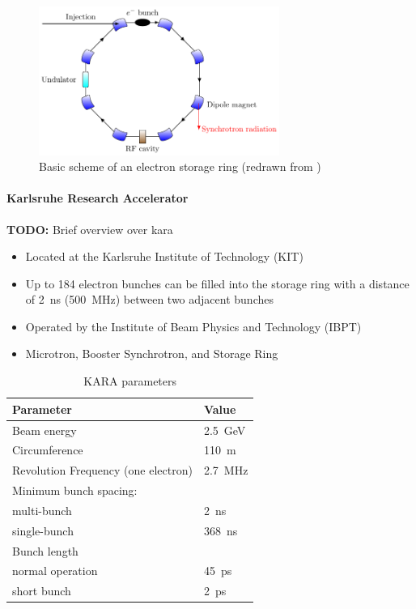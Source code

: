 \begin{figure}[tbh]
	\centering
	\includegraphics[width=0.7\textwidth]{chap/02-theory/img/synchrotron}
	\caption{Basic scheme of an electron storage ring (redrawn from \cite{roussel2014})}
	\label{fig:storageRing}
\end{figure}
\paragraph{Karlsruhe Research Accelerator}
\textbf{TODO:} Brief overview over \gls{kara}
\begin{itemize}[noitemsep]
	\item Located at the Karlsruhe Institute of Technology (KIT)
	\item Up to 184 electron bunches can be filled into the storage ring with a distance of \SI{2}{\nano\second} (\SI{500}{\mega\hertz}) between two adjacent bunches
	\item Operated by the Institute of Beam Physics and Technology (IBPT)
	\item Microtron, Booster Synchrotron, and Storage Ring
\end{itemize}

\begin{table}[tbh]
	\caption{KARA parameters \cite{rota2018}}
	\label{tab:kara}
	\centering
	\begin{tabularx}{0.7\textwidth}{Xl}
		\toprule
		\textbf{Parameter} & \textbf{Value} \\
		\midrule
		Beam energy    							&  \SI{2.5}{\giga \electronvolt} \\
		Circumference 	 						& \SI{110}{\meter}	  \\
		Revolution Frequency (one electron)   	& \SI{2.7}{\mega \hertz} 	\\
		Minimum bunch spacing:					& 	\\
		\quad multi-bunch 						& \SI{2}{\nano \second} \\
		\quad single-bunch 						& \SI{368}{\nano \second}	\\
		Bunch length							& \\
		\quad normal operation					& \SI{45}{\pico \second} \\
		\quad short bunch						& \SI{2}{\pico \second} \\
		\bottomrule		
	\end{tabularx}
\end{table}

